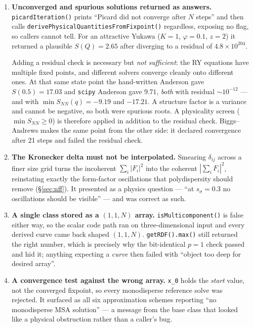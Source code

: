 \documentclass[11pt,a4paper]{article}
\newcommand{\code}[1]{\texttt{\hspace{0pt}#1}}
\begin{document}
\begin{enumerate}
\item \textbf{Unconverged and spurious solutions returned as answers.}
\code{picardIteration()} prints ``Picard did not converge after $N$ steps''
and then calls \code{derivePhysicalQuantitiesFromFixpoint()} regardless,
exposing no flag, so callers cannot tell. For an attractive Yukawa
($K=1$, $\varphi=0.1$, $z=2$) it returned a plausible $S(Q)=2.65$ after
diverging to a residual of $4.8\times10^{204}$.

Adding a residual check is necessary but \emph{not sufficient}: the RY
equations have multiple fixed points, and different solvers converge cleanly
onto different ones. At that same state point the hand-written Anderson gave
$S(0.5)=17.03$ and \code{scipy} Anderson gave $9.71$, \emph{both} with
residual ${\sim}10^{-12}$ --- and with $\min S_{NN}(q) = -9.19$ and $-17.21$.
A structure factor is a variance and cannot be negative, so both were
spurious roots. A physicality screen ($\min S_{NN} \ge 0$) is therefore
applied in addition to the residual check. Biggs--Andrews makes the same
point from the other side: it declared convergence after 21 steps and failed
the residual check.


\item \textbf{The Kronecker delta must not be interpolated.} Smearing
$\delta_{ij}$ across a finer size grid turns the incoherent $\sum_i|F_i|^2$
into the coherent $|\sum_i F_i|^2$, reinstating exactly the form-factor
oscillations that polydispersity should remove
(\S\ref{sec:nff}). It presented as a physics question --- ``at
$s_\sigma=0.3$ no oscillations should be visible'' --- and was correct as
such.

\item \textbf{A single class stored as a $(1,1,N)$ array.}
\code{isMulticomponent()} is false either way, so the scalar code path ran on
three-dimensional input and every derived curve came back shaped $(1,1,N)$.
\code{getRDF().max()} still returned the right number, which is precisely why
the bit-identical $p=1$ check passed and hid it; anything expecting a
\emph{curve} then failed with ``object too deep for desired array''.

\item \textbf{A convergence test against the wrong array.} \code{x\_0} holds
the \emph{start} value, not the converged fixpoint, so every monodisperse
reference solve was rejected. It surfaced as all six approximation schemes
reporting ``no monodisperse MSA solution'' --- a message from the base class
that looked like a physical obstruction rather than a caller's bug.


\end{enumerate}
\end{document}
